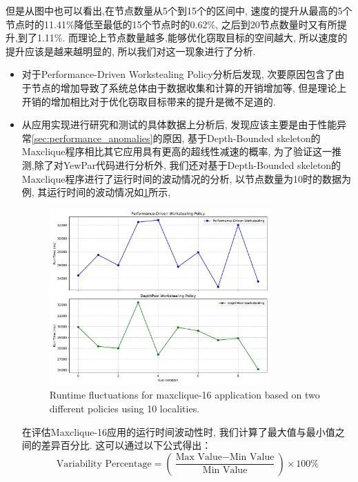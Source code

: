 \documentclass{mproj}
\begin{document}
但是从图中也可以看出,在节点数量从5个到15个的区间中,
速度的提升从最高的5个节点时的11.41\%降低至最低的15个节点时的0.62\%,
之后到20节点数量时又有所提升,到了1.11\%.
而理论上节点数量越多,能够优化窃取目标的空间越大,
所以速度的提升应该是越来越明显的,
所以我们对这一现象进行了分析.
\begin{itemize}
    \item 对于Performance-Driven Workstealing Policy分析后发现,
          次要原因包含了由于节点的增加导致了系统总体由于数据收集和计算的开销增加等,
          但是理论上开销的增加相比对于优化窃取目标带来的提升是微不足道的.
    \item 从应用实现进行研究和测试的具体数据上分析后,
          发现应该主要是由于性能异常\ref{sec:performance_anomalies}的原因,
          基于Depth-Bounded skeleton的Maxclique程序相比其它应用具有更高的超线性减速的概率,
          为了验证这一推测,除了对YewPar代码进行分析外,
          我们还对基于Depth-Bounded skeleton的Maxclique程序进行了运行时间的波动情况的分析,
          以节点数量为10时的数据为例,
          其运行时间的波动情况如\cref{fig:maxclique_16_fluctuations}所示,
          \begin{figure}[h]
              \centering
              \includegraphics[width=0.8\textwidth]{images/maxclique_16_fluctuations.pdf}
              \caption{Runtime fluctuations for maxclique-16 application based on two different policies using 10 localities.}
              \label{fig:maxclique_16_fluctuations}
          \end{figure}
          在评估Maxclique-16应用的运行时间波动性时,
          我们计算了最大值与最小值之间的差异百分比.
          这可以通过以下公式得出：
          \begin{equation}
              \text{Variability Percentage} = \left( \frac{\text{Max Value} - \text{Min Value}}{\text{Min Value}} \right) \times 100\%

\end{equation}
\end{itemize}
\end{document}
